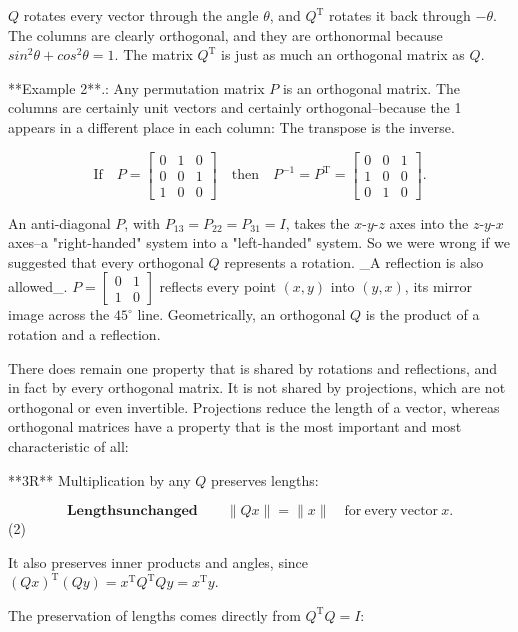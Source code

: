 \(Q\) rotates every vector through the angle \(\theta\), and \(Q^{\mathrm{T}}\) rotates it back through \(-\theta\). The columns are clearly orthogonal, and they are orthonormal because \(sin^{2}\theta+cos^{2}\theta=1\). The matrix \(Q^{\mathrm{T}}\) is just as much an orthogonal matrix as \(Q\).

**Example 2**.: Any permutation matrix \(P\) is an orthogonal matrix. The columns are certainly unit vectors and certainly orthogonal--because the 1 appears in a different place in each column: The transpose is the inverse.

\[\mathrm{If}\quad P=\begin{bmatrix}0&1&0\\ 0&0&1\\ 1&0&0\end{bmatrix}\quad\mathrm{then}\quad P^{-1}=P^{\mathrm{T}}=\begin{bmatrix} 0&0&1\\ 1&0&0\\ 0&1&0\end{bmatrix}.\]

An anti-diagonal \(P\), with \(P_{13}=P_{22}=P_{31}=I\), takes the \(x\)-\(y\)-\(z\) axes into the \(z\)-\(y\)-\(x\) axes--a "right-handed" system into a "left-handed" system. So we were wrong if we suggested that every orthogonal \(Q\) represents a rotation. _A reflection is also allowed_. \(P=\begin{bmatrix}0&1\\ 1&0\end{bmatrix}\) reflects every point \((x,y)\) into \((y,x)\), its mirror image across the \(45^{\circ}\) line. Geometrically, an orthogonal \(Q\) is the product of a rotation and a reflection.

There does remain one property that is shared by rotations and reflections, and in fact by every orthogonal matrix. It is not shared by projections, which are not orthogonal or even invertible. Projections reduce the length of a vector, whereas orthogonal matrices have a property that is the most important and most characteristic of all:

**3R** Multiplication by any \(Q\) preserves lengths:

\[\mathbf{Lengths unchanged}\qquad\|Qx\|=\|x\|\quad\mathrm{for\ every\ vector}\ x.\] (2)

It also preserves inner products and angles, since \((Qx)^{\mathrm{T}}(Qy)=x^{\mathrm{T}}Q^{\mathrm{T}}Qy=x^{\mathrm{T}}y\).

The preservation of lengths comes directly from \(Q^{\mathrm{T}}Q=I\):

